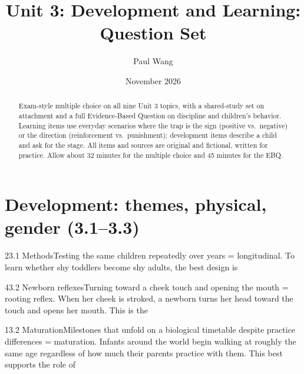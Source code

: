\documentclass[11pt]{article}
\title{Unit 3: Development and Learning: Question Set}
\author{Paul Wang}
\date{November 2026}
\begin{document}
\maketitle

\begin{abstract}
Exam-style multiple choice on all nine Unit 3 topics, with a shared-study set on attachment and a full Evidence-Based Question on discipline and children's behavior. Learning items use everyday scenarios where the trap is the sign (positive vs.\ negative) or the direction (reinforcement vs.\ punishment); development items describe a child and ask for the stage. All items and sources are original and fictional, written for practice. Allow about 32 minutes for the multiple choice and 45 minutes for the EBQ.
\end{abstract}


\section{Development: themes, physical, gender (3.1--3.3)}

\begin{q}{2}{3.1 Methods}{Testing the same children repeatedly over years = longitudinal.}
To learn whether shy toddlers become shy adults, the best design is
\end{q}

\begin{q}{4}{3.2 Newborn reflexes}{Turning toward a cheek touch and opening the mouth = rooting reflex.}
When her cheek is stroked, a newborn turns her head toward the touch and opens her mouth. This is the
\end{q}

\begin{q}{1}{3.2 Maturation}{Milestones that unfold on a biological timetable despite practice differences = maturation.}
Infants around the world begin walking at roughly the same age regardless of how much their parents practice with them. This best supports the role of
\end{q}
\end{document}
